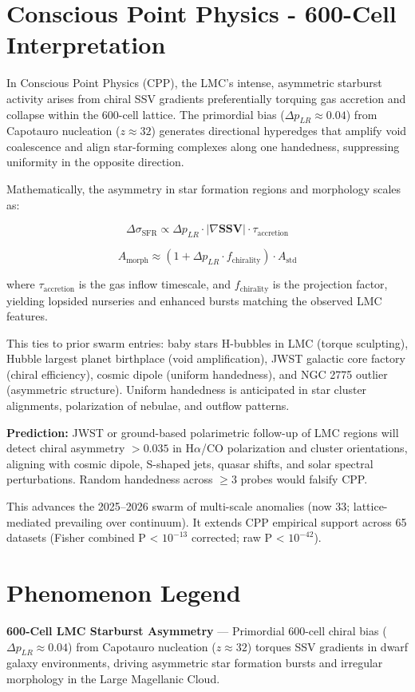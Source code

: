 \documentclass[11pt]{article}
\begin{document}
\section{Conscious Point Physics - 600-Cell Interpretation}
In Conscious Point Physics (CPP), the LMC's intense, asymmetric starburst activity arises from chiral SSV gradients preferentially torquing gas accretion and collapse within the 600-cell lattice. The primordial bias ($\Delta p_{LR} \approx 0.04$) from Capotauro nucleation ($z \approx 32$) generates directional hyperedges that amplify void coalescence and align star-forming complexes along one handedness, suppressing uniformity in the opposite direction.  

Mathematically, the asymmetry in star formation regions and morphology scales as:  

\[
\Delta \sigma_{\text{SFR}} \propto \Delta p_{LR} \cdot |\nabla \mathbf{SSV}| \cdot \tau_{\text{accretion}}
\]

\[
A_{\text{morph}} \approx (1 + \Delta p_{LR} \cdot f_{\text{chirality}}) \cdot A_{\text{std}}
\]

where $\tau_{\text{accretion}}$ is the gas inflow timescale, and $f_{\text{chirality}}$ is the projection factor, yielding lopsided nurseries and enhanced bursts matching the observed LMC features.  

This ties to prior swarm entries: baby stars H-bubbles in LMC (torque sculpting), Hubble largest planet birthplace (void amplification), JWST galactic core factory (chiral efficiency), cosmic dipole (uniform handedness), and NGC 2775 outlier (asymmetric structure). Uniform handedness is anticipated in star cluster alignments, polarization of nebulae, and outflow patterns.  

\textbf{Prediction:} JWST or ground-based polarimetric follow-up of LMC regions will detect chiral asymmetry $>0.035$ in H$\alpha$/CO polarization and cluster orientations, aligning with cosmic dipole, S-shaped jets, quasar shifts, and solar spectral perturbations. Random handedness across $\geq 3$ probes would falsify CPP.  

This advances the 2025--2026 swarm of multi-scale anomalies (now 33; lattice-mediated prevailing over continuum). It extends CPP empirical support across 65 datasets (Fisher combined P < $10^{-13}$ corrected; raw P < $10^{-42}$).

\section{Phenomenon Legend}
\textbf{600-Cell LMC Starburst Asymmetry} — Primordial 600-cell chiral bias ($\Delta p_{LR} \approx 0.04$) from Capotauro nucleation ($z \approx 32$) torques SSV gradients in dwarf galaxy environments, driving asymmetric star formation bursts and irregular morphology in the Large Magellanic Cloud.
\end{document}
